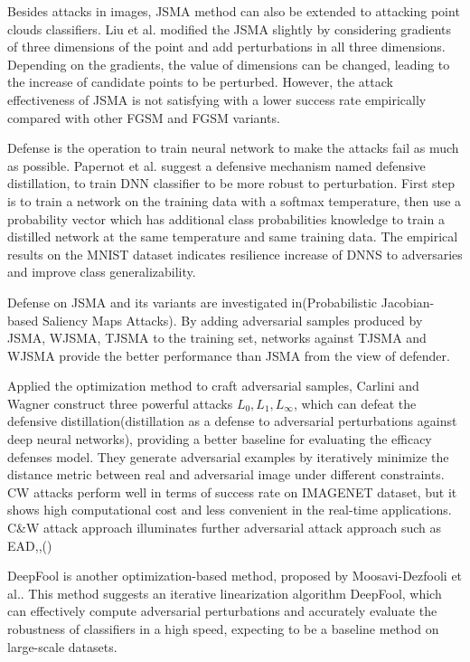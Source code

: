 Besides attacks in images, JSMA method can also be extended to attacking point clouds classifiers. Liu et al.\cite{liu_extending_2019} modified the JSMA slightly by considering gradients of three dimensions of the point and add perturbations in all three dimensions. Depending on the gradients, the value of dimensions can be changed, leading to the increase of candidate points to be perturbed. However, the attack effectiveness of JSMA is not satisfying with a lower success rate empirically compared with other FGSM and FGSM variants.

Defense is the operation to train neural network to make the attacks fail as much as possible. Papernot et al.\cite{papernot_distillation_2016} suggest a defensive mechanism named defensive distillation, to train DNN classifier to be more robust to perturbation. First step is to train a network on the training data with a softmax temperature, then use a probability vector which has additional class probabilities knowledge to train a distilled network at the same temperature and same training data. The empirical results on the MNIST dataset indicates resilience increase of DNNS to adversaries and improve class generalizability.

Defense on JSMA and its variants are investigated in(Probabilistic Jacobian-based Saliency Maps Attacks). By adding adversarial samples produced by JSMA, WJSMA, TJSMA to the training set, networks against TJSMA and WJSMA provide the better performance than JSMA from the view of defender.

Applied the optimization method to craft adversarial samples, Carlini and Wagner\cite{carlini_towards_2017} construct three powerful attacks \(L_{0},L_{1},L_{\infty}\), which can defeat the defensive distillation(distillation as a defense to adversarial perturbations against deep neural networks), providing a better baseline for evaluating the efficacy defenses model. They generate adversarial examples by iteratively minimize the distance metric between real and adversarial image under different constraints. CW attacks perform well in terms of success rate on IMAGENET dataset\cite{carlini_towards_2017,rottmann_detection_2021}, but it shows high computational cost and less convenient in the real-time applications\cite{combey_probabilistic_2020}. C\&W attack approach illuminates further adversarial attack approach such as EAD\cite{chen_ead_2018},\cite{sharif_accessorize_2016},()

DeepFool is another optimization-based method, proposed by Moosavi-Dezfooli et al.\cite{moosavi-dezfooli_deepfool_2016}. This method suggests an iterative linearization algorithm DeepFool, which can effectively compute adversarial perturbations and accurately evaluate the robustness of classifiers in a high speed, expecting to be a baseline method on large-scale datasets.

